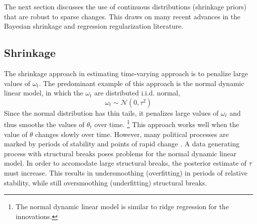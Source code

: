 \documentclass{article}
\newcommand{\paren}[1]{\ensuremath{\left(#1\right)}}
\newcommand{\dnorm}[1]{\ensuremath{\mathcal{N}\paren{#1}}}
\begin{document}
The next section discusses the use of continuous distributions (shrinkage priors) that are robust to sparse changes.
This draws on many recent advances in the Bayesian shrinkage and regression regularization literature.

\subsection{Shrinkage}
\label{sec:shrinkage}

The shrinkage approach in estimating time-varying approach is to penalize large values of $\omega_{t}$. 
The predominant example of this approach is the normal dynamic linear model, in which the $\omega_{t}$ are distributed i.i.d. normal,
\begin{equation}
  \label{eq:4}
  \omega_{t} \sim \dnorm{0, \tau^{2}}
\end{equation}
Since the normal distribution has thin tails, it penalizes large values of $\omega_{t}$ and thus smooths the values of $\theta_{t}$ over time.
\footnote{The normal dynamic linear model is similar to ridge regression for the innovations.}
This approach works well when the value of $\theta$ changes slowly over time.
However, many political processes are marked by periods of stability and points of rapid change \parencite{RatkovicEng2010}.
A data generating process with structural breaks poses problems for the normal dynamic linear model.
In order to accomodate large structural breaks, the posterior estimate of $\tau$ must increase. 
This results in undersmoothing (overfitting) in periods of relative stability, while still oversmoothing (underfitting) structural breaks.
\end{document}
